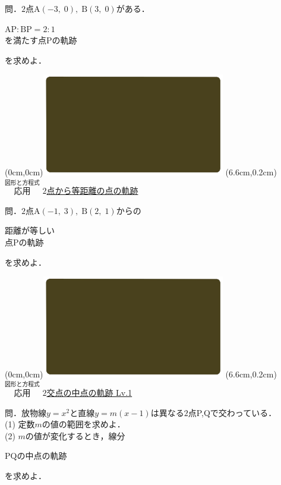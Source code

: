 \documentclass[10pt,
fleqn,
dvipdfmx,
uplatex
]{jsarticle}
\begin{document}
\large 
問．$2$点$\text{A}\left(-3,\;0\right),\;\text{B}\left(3,\;0\right)$がある．

\huge
\vspace{-0.0zw}
\hspace{0.5zw}$\text{AP}:\text{BP}=2:1$\vspace{-0.0zw}\\
\hfill を満たす点$\text{P}$の軌跡\hspace{0.4zw}

\large 
\vspace{0.2zw}
\hfill を求めよ．

\newpage

\at(0cm,0cm){\includegraphics[width=8cm,bb=0 0 1920 1080]{./youtube/thumbnails/templates/smart_background/図形と方程式.jpeg}}
\at(6.6cm,0.2cm){\small\color{bradorange}$\overset{\text{図形と方程式}}{\text{応用}}$}
{\color{orange}\Large\underline{$2$点から等距離の点の軌跡}}\vspace{0.3zw}

\large 
問．$2$点$\text{A}\left(-1,\;3\right),\;\text{B}\left(2,\;1\right)$からの

\Huge
\vspace{-0.2zw}
\hspace{0.2zw}距離が等しい\vspace{-0.2zw}\\
\hfill 点$\text{P}$の軌跡\hspace{0.2zw}

\large 
\vspace{0.2zw}
\hfill を求めよ．



\newpage



\at(0cm,0cm){\includegraphics[width=8cm,bb=0 0 1920 1080]{./youtube/thumbnails/templates/smart_background/図形と方程式.jpeg}}
\at(6.6cm,0.2cm){\small\color{bradorange}$\overset{\text{図形と方程式}}{\text{応用}}$}
{\color{orange}\Large\underline{$2$交点の中点の軌跡 Lv.1 }}\vspace{0.3zw}

\small 
問．放物線$y=x^2$と直線$y=m\left(x-1\right)$は異なる$2$点P,\;Qで交わっている． \\
(1)  定数$m$の値の範囲を求めよ．\\
(2)  $m$の値が変化するとき，線分

\Huge
\vspace{-0.2zw}
\hspace{0.5zw}$\text{PQ}$の中点の軌跡

\small
\vspace{0.2zw}
\hfill を求めよ．\\
\end{document}
